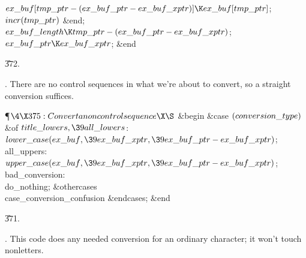 $\\{ex\_buf}[\\{tmp\_ptr}-(\\{ex\_buf\_ptr}-\\{ex\_buf\_xptr})]\K\\{ex\_buf}[%
\\{tmp\_ptr}]$;\5
$\\{incr}(\\{tmp\_ptr})$\6
\&{end};\2\6
$\\{ex\_buf\_length}\K\\{tmp\_ptr}-(\\{ex\_buf\_ptr}-\\{ex\_buf\_xptr})$;\5
$\\{ex\_buf\_ptr}\K\\{ex\_buf\_xptr}$;\6
\&{end}\par
\U372.\fi

.
There are no control sequences in what we're about to convert,
so a straight conversion suffices.

\Y\P$\4\X375:Convert a noncontrol sequence\X\S$\6
\&{begin} \&{case} $(\\{conversion\_type})$ \1\&{of}\6
\4$\\{title\_lowers},\39\\{all\_lowers}$: $\\{lower\_case}(\\{ex\_buf},\39%
\\{ex\_buf\_xptr},\39\\{ex\_buf\_ptr}-\\{ex\_buf\_xptr})$;\6
\4\\{all\_uppers}: $\\{upper\_case}(\\{ex\_buf},\39\\{ex\_buf\_xptr},\39%
\\{ex\_buf\_ptr}-\\{ex\_buf\_xptr})$;\6
\4\\{bad\_conversion}: \\{do\_nothing};\6
\4\&{othercases} \\{case\_conversion\_confusion}\2\6
\&{endcases};\6
\&{end}\par
\U371.\fi

.
This code does any needed conversion for an ordinary character; it
won't touch nonletters.

